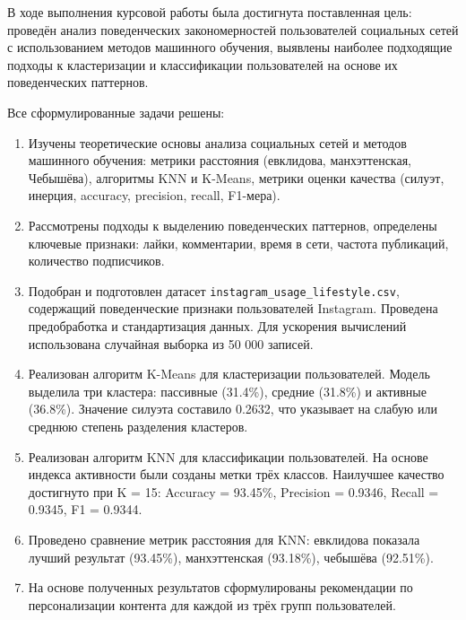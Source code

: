 \documentclass[14pt, a4paper]{extarticle}
\begin{document}
В ходе выполнения курсовой работы была достигнута поставленная цель: проведён анализ поведенческих закономерностей пользователей социальных сетей с использованием методов машинного обучения, выявлены наиболее подходящие подходы к кластеризации и классификации пользователей на основе их поведенческих паттернов.

Все сформулированные задачи решены:

\begin{enumerate}
    \item Изучены теоретические основы анализа социальных сетей и методов машинного обучения: метрики расстояния (евклидова, манхэттенская, Чебышёва), алгоритмы KNN и K-Means, метрики оценки качества (силуэт, инерция, accuracy, precision, recall, F1-мера).
    
    \item Рассмотрены подходы к выделению поведенческих паттернов, определены ключевые признаки: лайки, комментарии, время в сети, частота публикаций, количество подписчиков.
    
    \item Подобран и подготовлен датасет \texttt{instagram\_usage\_lifestyle.csv}, содержащий поведенческие признаки пользователей Instagram. Проведена предобработка и стандартизация данных. Для ускорения вычислений использована случайная выборка из 50 000 записей.
    
    \item Реализован алгоритм K-Means для кластеризации пользователей. Модель выделила три кластера: пассивные (31.4\%), средние (31.8\%) и активные (36.8\%). Значение силуэта составило 0.2632, что указывает на слабую или среднюю степень разделения кластеров.
    
    \item Реализован алгоритм KNN для классификации пользователей. На основе индекса активности были созданы метки трёх классов. Наилучшее качество достигнуто при K = 15: Accuracy = 93.45\%, Precision = 0.9346, Recall = 0.9345, F1 = 0.9344.
    
    \item Проведено сравнение метрик расстояния для KNN: евклидова показала лучший результат (93.45\%), манхэттенская (93.18\%), чебышёва (92.51\%).
    
    \item На основе полученных результатов сформулированы рекомендации по персонализации контента для каждой из трёх групп пользователей.
\end{enumerate}
\end{document}
